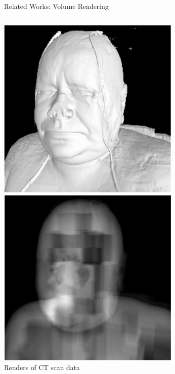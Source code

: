 \documentclass[10pt,compress,professionalfont]{beamer}
\begin{document}
\begin{frame}{Related Works: Volume Rendering}
\begin{columns}
\begin{column}{0.3\textwidth}
            \includegraphics[width=\textwidth]{../img/external/vol_multi_res}\\
            {\centering\scriptsize Renders of CT scan data\\}
        \end{column}
    \end{columns}

\end{frame}
\end{document}

